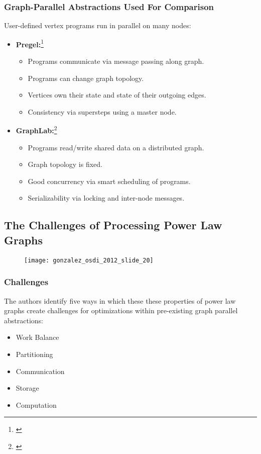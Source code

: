 \begin{frame}
  \frametitle{Graph-Parallel Abstractions Used For Comparison}
  User-defined vertex programs run in parallel on many nodes:
  \begin{itemize}
    \item \textbf{Pregel:}\footnote{\cite[SIGMOD '10]{malewicz2010pregel}}
      \begin{itemize}
        \item Programs communicate via message passing along graph.
        \item Programs can change graph topology.
        \item Vertices own their state and state of their outgoing edges.
        \item Consistency via supersteps using a master node.
      \end{itemize}
    \item \textbf{GraphLab:}\footnote{\cite[VLDB '12]{low2012distributed}}
      \begin{itemize}
        \item Programs read/write shared data on a distributed graph.
        \item Graph topology is fixed.
        \item Good concurrency via smart scheduling of programs.
        \item Serializability via locking and inter-node messages.
      \end{itemize}
  \end{itemize}
\end{frame}


\subsection{The Challenges of Processing Power Law Graphs}

\begin{frame}
  \begin{figure}
    \centering
    \texttt{[image: gonzalez\_osdi\_2012\_slide\_20]}
    \caption{\cite[OSDI '12]{gonzalez2012powergraph-slides}}
  \end{figure}
\end{frame}

\begin{frame}
  \frametitle{Challenges}
  The authors identify five ways in which these these properties of power law
  graphs create challenges for optimizations within pre-existing graph parallel
  abstractions:
  \begin{itemize}
    \item Work Balance
    \item Partitioning
    \item Communication
    \item Storage
    \item Computation
  \end{itemize}
\end{frame}
